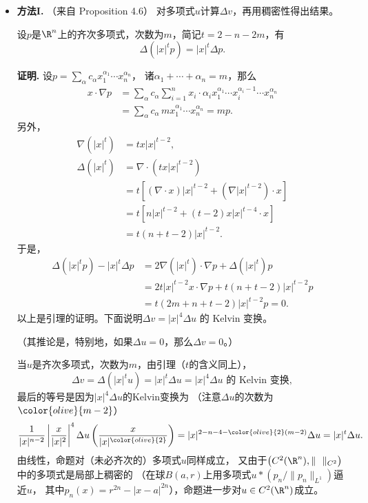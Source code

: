 \begin{itemize}
	\item[9.]
\textbf{方法I.} （来自\cite{Ax} Proposition 4.6）
对多项式$u$计算$\Delta v$，再用稠密性得出结果。
\begin{lemma*}
    设$p$是$\R^n$上的齐次多项式，次数为$m$，简记$t=2-n-2m$，有
    $$\Delta(|x|^tp)=|x|^t\Delta p.$$
\end{lemma*}
\textbf{证明.}
    设$p=\sum\limits_\alpha c_\alpha x_1^{\alpha_1}\cdots x_n^{\alpha_n}$，
    诸$\alpha_1+\cdots+\alpha_n=m$，那么
    \begin{align*}
    x\cdot\nabla p&=\sum_\alpha c_\alpha \sum_{i=1}^n x_i\cdot 
    \alpha_i x_1^{\alpha_1}\cdots x_i^{\alpha_i-1}\cdots x_n^{\alpha_n}\\
    &=\sum_\alpha c_\alpha \,m x_1^{\alpha_1}\cdots x_n^{\alpha_n}=mp.
    \end{align*}
    另外，
    \begin{align*}
        \nabla(|x|^t)&=tx|x|^{t-2},\\
        \Delta(|x|^t)&=\nabla\cdot(tx|x|^{t-2})\\
        &=t[(\nabla\cdot x)|x|^{t-2}+(\nabla|x|^{t-2})\cdot x]\\
        &=t[n|x|^{t-2}+(t-2)x|x|^{t-4}\cdot x]\\
        &=t(n+t-2)|x|^{t-2}.
    \end{align*}
    于是，
    \begin{align*}
        \Delta(|x|^tp)-|x|^t\Delta p
        &=2\nabla(|x|^t)\cdot\nabla p+\Delta(|x|^t)p\\
        &=2t|x|^{t-2}x\cdot\nabla p+t(n+t-2)|x|^{t-2}p\\
        &=t(2m+n+t-2)|x|^{t-2}p=0.
    \end{align*}
以上是引理的证明。下面说明$\Delta v=|x|^4\Delta u\text{ 的 Kelvin 变换}$。

（其推论是，特别地，如果$\Delta u=0$，那么$\Delta v=0$。）

当$u$是齐次多项式，次数为$m$，由引理（$t$的含义同上），
$$\Delta v=\Delta(|x|^tu)=|x|^t\Delta u=|x|^4\Delta u\text{ 的 Kelvin 变换},$$
最后的等号是因为$|x|^4\Delta u$的$\text{Kelvin}$变换为
（注意$\Delta u$的次数为$\color{olive}{m-2}$）
\[\frac{1}{|x|^{n-2}}\left|\frac{x}{|x|^2}\right|^4
\Delta u\left(\frac{x}{|x|^{\color{olive}{2}}}\right)
=|x|^{2-n-4-\color{olive}{2}(m-2)}\Delta u=|x|^t\Delta u.\]
由线性，命题对（未必齐次的）多项式$u$同样成立，
又由于$\big(C^2(\R^n),\|\ \ \|_{C^2}\big)$中的多项式是局部上稠密的
（在球$B(a,r)$上用多项式$u*(p_n/\|p_n\|_{L^1})$逼近$u$，
其中$p_n(x)=r^{2n}-|x-a|^{2n}$），命题进一步对$u\in C^2(\R^n)$成立。


\end{itemize}
